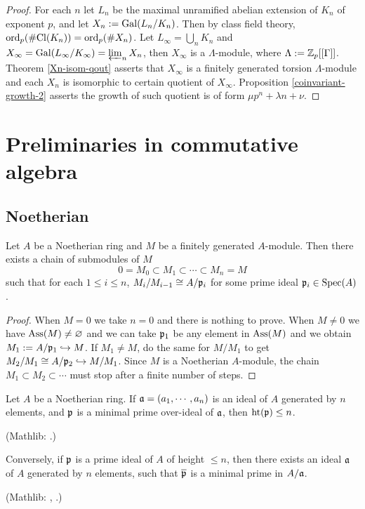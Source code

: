 \begin{proof}
For each $n$ let $L_n$ be the maximal unramified abelian extension of $K_n$
of exponent $p$, and let $X_n:={\mathrm{Gal}}(L_n/K_n)$.
Then by class field theory, $\operatorname{ord}_p(\#{\mathrm{Cl}}(K_n))=\operatorname{ord}_p(\# X_n)$.
Let $L_\infty=\bigcup_n K_n$ and $X_\infty={\mathrm{Gal}}(L_\infty/K_\infty)=\varprojlim_n X_n$,
then $X_\infty$ is a $\Lambda$-module, where $\Lambda:={\mathbb {Z}}_p[[\Gamma]]$.
Theorem \ref{Xn-isom-qout} asserts that $X_\infty$ is a finitely generated
torsion $\Lambda$-module and each $X_n$ is isomorphic to certain quotient of $X_\infty$.
Proposition \ref{coinvariant-growth-2} asserts the growth of such quotient
is of form $\mu p^n+\lambda n+\nu$.
\end{proof}

\section{Preliminaries in commutative algebra}

\subsection{Noetherian}

\begin{prop}
\label{noeth-ring-filtration}
\leanok
Let $A$ be a Noetherian ring and $M$ be a finitely generated $A$-module.
Then there exists a chain of submodules of $M$
\[0 = M_0 \subset M_1 \subset \cdots \subset M_n = M\]
such that for each $1\leq i\leq n$, $M_i/M_{i-1} \cong A/{\mathfrak{p}}_i$ for some prime ideal ${\mathfrak{p}}_i\in{\mathrm{Spec}}(A)$.
\end{prop}

\begin{proof}
\leanok
When $M=0$ we take $n=0$ and there is nothing to prove.
When $M\neq 0$ we have $\operatorname{Ass}(M)\neq\varnothing$
and we can take ${\mathfrak{p}}_1$ be any element in $\operatorname{Ass}(M)$
and we obtain $M_1:=A/{\mathfrak{p}}_1\hookrightarrow M$.
If $M_1\neq M$, do the same for $M/M_1$ to get $M_2/M_1\cong A/{\mathfrak{p}}_2\hookrightarrow M/M_1$.
Since $M$ is a Noetherian $A$-module,
the chain $M_1\subset M_2\subset\cdots$ must stop after a finite number of steps.
\end{proof}

\begin{thm}
\leanok
\label{krull-principal-ideal-thm}
Let $A$ be a Noetherian ring.
If ${\mathfrak{a}}=(a_1,\cdots,a_n)$ is an ideal of $A$ generated by $n$ elements,
and ${\mathfrak{p}}$ is a minimal prime over-ideal of ${\mathfrak{a}}$, then ${\mathrm{ht}}({\mathfrak{p}})\leq n$.

(Mathlib: .)

Conversely, if ${\mathfrak{p}}$ is a prime ideal of $A$ of height $\leq n$,
then there exists an ideal ${\mathfrak{a}}$ of $A$ generated by $n$ elements, such that
$\overline{{\mathfrak{p}}}$ is a minimal prime in $A/{\mathfrak{a}}$.

(Mathlib: ,
.)
\end{thm}

